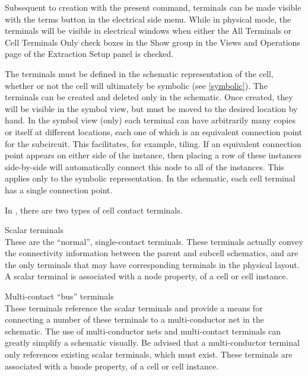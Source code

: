 Subsequent to creation with the present command, terminals can be made
visible with the {\cb terms} button in the electrical side menu. 
While in physical mode, the terminals will be visible in electrical
windows when either the {\cb All Terminals} or {\cb Cell Terminals
Only} check boxes in the {\cb Show} group in the {\cb Views and
Operations} page of the {\cb Extraction Setup} panel is checked. 

The terminals must be defined in the schematic representation of the
cell, whether or not the cell will ultimately be symbolic (see
\ref{symbolic}).  The terminals can be created and deleted only in the
schematic.  Once created, they will be visible in the symbol view, but
must be moved to the desired location by hand.  In the symbol view
(only) each terminal can have arbitrarily many copies or itself at
different locations, each one of which is an equivalent connection
point for the subcircuit.  This facilitates, for example, tiling.  If
an equivalent connection point appears on either side of the instance,
then placing a row of these instances side-by-side will automatically
connect this node to all of the instances.  This applies only to the
symbolic representation.  In the schematic, each cell terminal has a
single connection point.

In {\Xic}, there are two types of cell contact terminals.

\begin{description}
\item{Scalar terminals}\\
These are the ``normal'', single-contact terminals.  These terminals
actually convey the connectivity information between the parent and
subcell schematics, and are the only terminals that may have
corresponding terminals in the physical layout.  A scalar terminal is
associated with a {\et node} property, of a cell or cell instance.

\item{Multi-contact ``bus'' terminals}\\
These terminals reference the scalar terminals and provide a means for
connecting a number of these terminals to a multi-conductor net in the
schematic.  The use of multi-conductor nets and multi-contact
terminals can greatly simplify a schematic visually.  Be advised that
a multi-conductor terminal only references existing scalar terminals,
which must exist.  These terminals are associated with a {\et bnode}
property, of a cell or cell instance.
\end{description}

